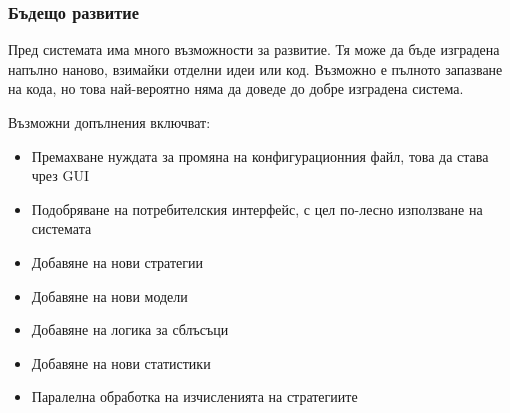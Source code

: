 \subsubsection{Бъдещо развитие}
	Пред системата има много възможности за развитие. Тя може да бъде изградена напълно наново, взимайки отделни идеи
	или код. Възможно е пълното запазване на кода, но това най-вероятно няма да доведе до добре изградена
	система.
	
	Възможни допълнения включват:
	
	\begin{itemize}
		\item Премахване нуждата за промяна на конфигурационния файл, това да става чрез \ac{GUI}
		\item Подобряване на потребителския интерфейс, с цел по-лесно използване на системата
		\item Добавяне на нови стратегии
		\item Добавяне на нови модели
		\item Добавяне на логика за сблъсъци
		\item Добавяне на нови статистики
		\item Паралелна обработка на изчисленията на стратегиите 
	\end{itemize}